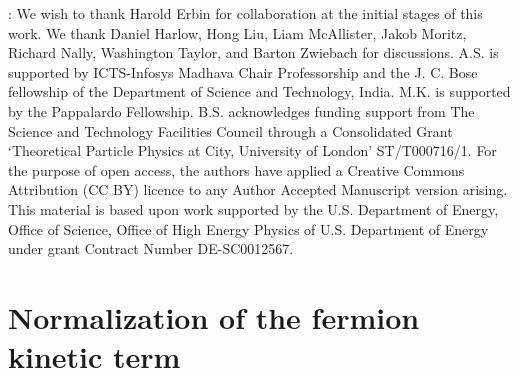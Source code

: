 \documentclass[12pt,a4paper]{article}
\begin{document}
: We wish to thank Harold Erbin for collaboration at the
initial stages of this work. We thank  Daniel Harlow, Hong Liu, Liam McAllister, Jakob Moritz,
Richard Nally, Washington Taylor, and Barton Zwiebach for discussions.
A.S. is supported by ICTS-Infosys Madhava Chair Professorship
and the J. C. Bose fellowship of the Department of Science and Technology,
India. M.K. is supported by the Pappalardo Fellowship.
B.S. acknowledges funding support from The Science and Technology Facilities Council through
a Consolidated Grant ‘Theoretical Particle Physics at City, University of London’ ST/T000716/1.
For the purpose of open access, the authors have applied a Creative Commons Attribution (CC BY)
licence to any Author Accepted Manuscript version arising.
This material is based upon work supported by the U.S. Department of Energy, Office of Science,
Office of High Energy Physics of U.S. Department of Energy under grant Contract Number DE-SC0012567.

\appendix

\section{Normalization of the fermion kinetic term} \label{eappc}
\end{document}

